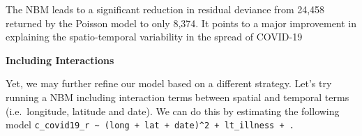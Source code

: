 \documentclass[
]{book}
\newenvironment{Shaded}{\begin{snugshade}}{\end{snugshade}}
\newcommand{\CommentTok}[1]{\textcolor[rgb]{0.56,0.35,0.01}{\textit{#1}}}
\newcommand{\DataTypeTok}[1]{\textcolor[rgb]{0.13,0.29,0.53}{#1}}
\newcommand{\DecValTok}[1]{\textcolor[rgb]{0.00,0.00,0.81}{#1}}
\newcommand{\KeywordTok}[1]{\textcolor[rgb]{0.13,0.29,0.53}{\textbf{#1}}}
\newcommand{\NormalTok}[1]{#1}
\newcommand{\OperatorTok}[1]{\textcolor[rgb]{0.81,0.36,0.00}{\textbf{#1}}}
\newcommand{\StringTok}[1]{\textcolor[rgb]{0.31,0.60,0.02}{#1}}
\begin{document}
The NBM leads to a significant reduction in residual deviance from 24,458 returned by the Poisson model to only 8,374. It points to a major improvement in explaining the spatio-temporal variability in the spread of COVID-19

\textbf{Including Interactions}

Yet, we may further refine our model based on a different strategy. Let's try running a NBM including interaction terms between spatial and temporal terms (i.e.~longitude, latitude and date). We can do this by estimating the following model \texttt{c\_covid19\_r\ \textasciitilde{}\ (long\ +\ lat\ +\ date)\^{}2\ +\ lt\_illness\ +\ .}

\begin{Shaded}
\end{Shaded}
\end{document}
